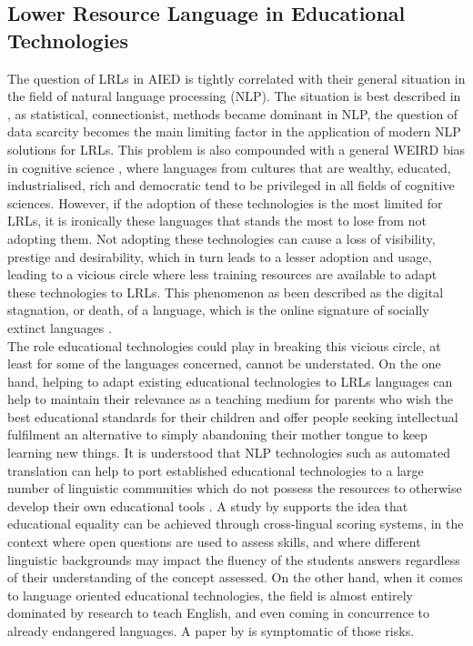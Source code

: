     \subsection{Lower Resource Language in Educational Technologies}
The question of LRLs in AIED is tightly correlated with their general situation in the field of natural language processing (NLP). The situation is best described in \textcite{magueresse_low-resource_2020}, as statistical, connectionist, methods became dominant in NLP, the question of data scarcity becomes the main limiting factor in the application of modern NLP solutions for LRLs. This problem is also compounded with a general WEIRD bias in cognitive science \parencite{henrich_most_2010}, where languages from cultures that are wealthy, educated, industrialised, rich and democratic tend to be privileged in all fields of cognitive sciences. However, if the adoption of these technologies is the most limited for LRLs, it is ironically these languages that stands the most to lose from not adopting them. Not adopting these technologies can cause a loss of visibility, prestige and desirability, which in turn leads to a lesser adoption and usage, leading to a vicious circle where less training resources are available to adapt these technologies to LRLs. This phenomenon as been described as the digital stagnation, or death, of a language, which is the online signature of socially extinct languages \parencite{kornai_digital_2013}.\\
The role educational technologies could play in breaking this vicious circle, at least for some of the languages concerned, cannot be understated. On the one hand, helping to adapt existing educational technologies to LRLs languages can help to maintain their relevance as a teaching medium for parents who wish the best educational standards for their children and offer people seeking intellectual fulfilment an alternative to simply abandoning their mother tongue to keep learning new things. It is understood that NLP technologies such as automated translation can help to port established educational technologies to a large number of linguistic communities which do not possess the resources to otherwise develop their own educational tools \parencite{haddow_survey_2022}. A study by \textcite{horbach_crosslingual_2024} supports the idea that educational equality can be achieved through cross-lingual scoring systems, in the context where open questions are used to assess skills, and where different linguistic backgrounds may impact the fluency of the students answers regardless of their understanding of the concept assessed. On the other hand, when it comes to language oriented educational technologies, the field is almost entirely dominated by research to teach English, and even coming in concurrence to already endangered languages. A paper by \textcite{henkel_supporting_2025} is symptomatic of those risks.
